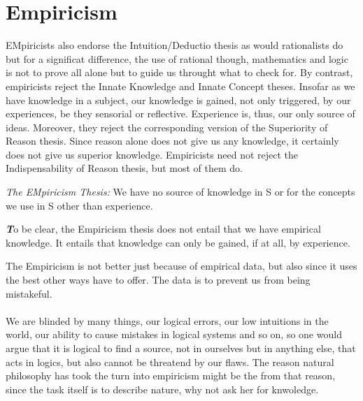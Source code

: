 \documentclass[9pt,a4paper,twocolumn]{article}
\newcounter{def}
\newenvironment{callout}
	{\begin{calloutbox}\color{charcoal}\textbf\textit}
	{\end{calloutbox}}
\begin{document}
        \section{Empiricism}
            EMpiricists also endorse the Intuition/Deductio thesis as would rationalists do but for a significat difference, the use of rational though, mathematics and logic is not to prove all alone but to guide us throught what to check for.  By contrast, empiricists reject the Innate Knowledge and Innate Concept theses. Insofar as we have knowledge in a subject, our knowledge is gained, not only triggered, by our experiences, be they sensorial or reflective. Experience is, thus, our only source of ideas. Moreover, they reject the corresponding version of the Superiority of Reason thesis. Since reason alone does not give us any knowledge, it certainly does not give us superior knowledge. Empiricists need not reject the Indispensability of Reason thesis, but most of them do.\cite{sep-rationalism-empiricism}
            \begin{define}
                \textit{The EMpiricism Thesis: } We have no source of knowledge in S or for the concepts we use in S other than experience.
            \end{define}
            \begin{callout}
                To be clear, the Empiricism thesis does not entail that we have empirical knowledge. It entails that knowledge can only be gained, if at all, by experience.
            \end{callout}
            The Empiricism is not better just because of empirical data, but also since it uses the best other ways have to offer. The data is to prevent us from being mistakeful. 
            \\
            \\
            We are blinded by many things, our logical errors, our low intuitions in the world, our ability to cause mistakes in logical systems and so on, so one would argue that it is logical to find a source, not in ourselves but in anything else, that acts in logics, but also cannot be threatend by our flaws. The reason natural philosophy has took the turn into empiricism might be the from that reason, since the task itself is to describe nature, why not ask her for knwoledge.
            \\
            \\
\end{document}
